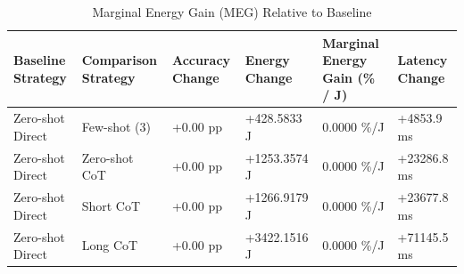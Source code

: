 \begin{table}
\caption{Marginal Energy Gain (MEG) Relative to Baseline}
\label{tab:marginal_energy_gain}
\begin{tabular}{llllll}
\toprule
Baseline Strategy & Comparison Strategy & Accuracy Change & Energy Change & Marginal Energy Gain (\% / J) & Latency Change \\
\midrule
Zero-shot Direct & Few-shot (3) & +0.00 pp & +428.5833 J & 0.0000 \%/J & +4853.9 ms \\
Zero-shot Direct & Zero-shot CoT & +0.00 pp & +1253.3574 J & 0.0000 \%/J & +23286.8 ms \\
Zero-shot Direct & Short CoT & +0.00 pp & +1266.9179 J & 0.0000 \%/J & +23677.8 ms \\
Zero-shot Direct & Long CoT & +0.00 pp & +3422.1516 J & 0.0000 \%/J & +71145.5 ms \\
\bottomrule
\end{tabular}
\end{table}
